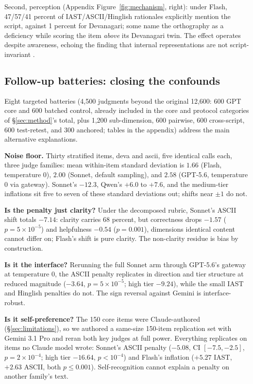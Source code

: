 Second, perception (Appendix Figure~\ref{fig:mechanism}, right): under Flash, 47/57/41 percent of IAST/ASCII/Hinglish rationales explicitly mention the script, against 1 percent for Devanagari; some name the orthography as a deficiency while scoring the item \emph{above} its Devanagari twin. The effect operates despite awareness, echoing the finding that internal representations are not script-invariant \citep{karne2026onelanguage, saji2025romanlens}.

\subsection{Follow-up batteries: closing the confounds}
\label{sec:followup}

Eight targeted batteries (4{,}500 judgments beyond the original 12{,}600: 600 GPT core and 600 batched control, already included in the core and protocol categories of \S\ref{sec:method}'s total, plus 1{,}200 sub-dimension, 600 pairwise, 600 cross-script, 600 test-retest, and 300 anchored; tables in the appendix) address the main alternative explanations.

\textbf{Noise floor.} Thirty stratified items, deva and ascii, five identical calls each, three judge families: mean within-item standard deviation is $1.66$ (Flash, temperature 0), $2.00$ (Sonnet, default sampling), and $2.58$ (GPT-5.6, temperature 0 via gateway). Sonnet's $-12.3$, Qwen's $+6.0$ to $+7.6$, and the medium-tier inflations sit five to seven of these standard deviations out; shifts near $\pm 1$ do not.

\textbf{Is the penalty just clarity?} Under the decomposed rubric, Sonnet's ASCII shift totals $-7.14$: clarity carries 68 percent, but correctness drops $-1.57$ ($p = 5 \times 10^{-5}$) and helpfulness $-0.54$ ($p = 0.001$), dimensions identical content cannot differ on; Flash's shift is pure clarity. The non-clarity residue is bias by construction.

\textbf{Is it the interface?} Rerunning the full Sonnet arm through GPT-5.6's gateway at temperature 0, the ASCII penalty replicates in direction and tier structure at reduced magnitude ($-3.64$, $p = 5 \times 10^{-5}$; high tier $-9.24$), while the small IAST and Hinglish penalties do not. The sign reversal against Gemini is interface-robust.

\textbf{Is it self-preference?} The 150 core items were Claude-authored (\S\ref{sec:limitations}), so we authored a same-size 150-item replication set with Gemini 3.1 Pro and reran both key judges at full power. Everything replicates on items no Claude model wrote: Sonnet's ASCII penalty ($-5.08$, CI $[-7.5, -2.5]$, $p = 2 \times 10^{-4}$; high tier $-16.64$, $p < 10^{-4}$) and Flash's inflation ($+5.27$ IAST, $+2.63$ ASCII, both $p \le 0.001$). Self-recognition cannot explain a penalty on another family's text.

